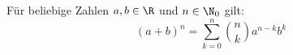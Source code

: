Für beliebige Zahlen $a, b \in \R$ und $n \in \N_0$ gilt:
$$(a+b)^n = \sum_{k=0}^n \binom{n}{k} a^{n-k} b^k$$